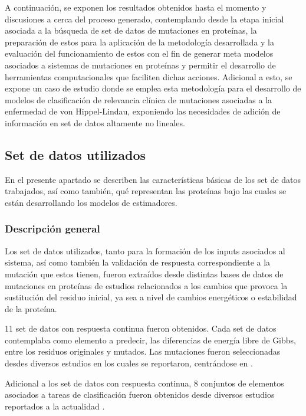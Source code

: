 A continuación, se exponen los resultados obtenidos hasta el momento y discusiones a cerca del proceso generado, contemplando desde la etapa inicial asociada a la búsqueda de set de datos de mutaciones en proteínas, la preparación de estos para la aplicación de la metodología desarrollada y la evaluación del funcionamiento de estos con el fin de generar meta modelos asociados a sistemas de mutaciones en proteínas y permitir el desarrollo de herramientas computacionales que faciliten dichas acciones. Adicional a esto, se expone un caso de estudio donde se emplea esta metodología para el desarrollo de modelos de clasificación de relevancia clínica de mutaciones asociadas a la enfermedad de von Hippel-Lindau, exponiendo las necesidades de adición de información en set de datos altamente no lineales.

\subsection{Set de datos utilizados}

En el presente apartado se describen las características básicas de los set de datos trabajados, así como también, qué representan las proteínas bajo las cuales se están desarrollando los modelos de estimadores.

\subsubsection{Descripción general}

Los set de datos utilizados, tanto para la formación de los inputs asociados al sistema, así como también la validación de respuesta correspondiente a la mutación que estos tienen, fueron extraídos desde distintas bases de datos de mutaciones en proteínas de estudios relacionados a los cambios que provoca la sustitución del residuo inicial, ya sea a nivel de cambios energéticos o estabilidad de la proteína.

11 set de datos con respuesta continua fueron obtenidos. Cada set de datos contemplaba como elemento a predecir, las diferencias de energía libre de Gibbs, entre los residuos originales y mutados. Las mutaciones fueron seleccionadas desdes diversos estudios en los cuales se reportaron, centrándose en \cite{Wainreb2011, Sun2017, petukh2016saambe, Alexov2012,prot20185}.

Adicional a los set de datos con respuesta continua, 8 conjuntos de elementos asociados a tareas de clasificación fueron obtenidos desde diversos estudios reportados a la actualidad \cite{ancien2018prediction, broom2017computational, capriotti2008three, quan2016strum, Capriotti2005, 1gzp030, Khan2010, masso2008accurate, getov2016saafec}. 

